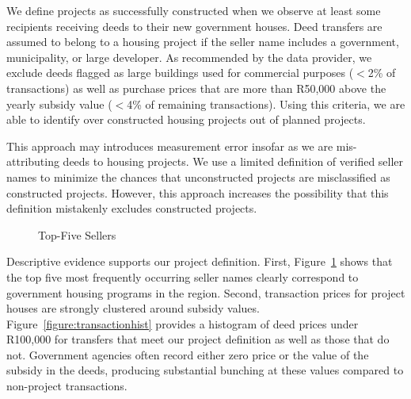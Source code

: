 \documentclass[12pt]{article}
\begin{document}

We define projects as successfully constructed when we observe at least some recipients receiving deeds to their new government houses.  Deed transfers are assumed to belong to a housing project if the seller name includes a government, municipality, or large developer.  As recommended by the data provider, we exclude deeds flagged as large buildings used for commercial purposes ($<$2\% of transactions) as well as purchase prices that are more than R50,000 above the yearly subsidy value ($<$4\% of remaining transactions).  Using this criteria, we are able to identify over  constructed housing projects out of planned projects.

This approach may introduces measurement error insofar as we are mis-attributing deeds to housing projects.  We use a limited definition of verified seller names to minimize the chances that unconstructed projects are misclassified as constructed projects.  However, this approach increases the possibility that this definition mistakenly excludes constructed projects.

\begin{figure}
\caption{Top-Five Sellers}\label{figure:topfivesellers}
\centering

\end{figure}

Descriptive evidence supports our project definition.  First, Figure~\ref{figure:topfivesellers} shows that the top five most frequently occurring seller names clearly correspond to government housing programs in the region.  Second, transaction prices for project houses are strongly clustered around subsidy values.  Figure~\ref{figure:transactionhist} provides a histogram of deed prices under R100,000 for transfers that meet our project definition as well as those that do not.  Government agencies often record either zero price or the value of the subsidy in the deeds, producing substantial bunching at these values compared to non-project transactions.  

\end{document}
